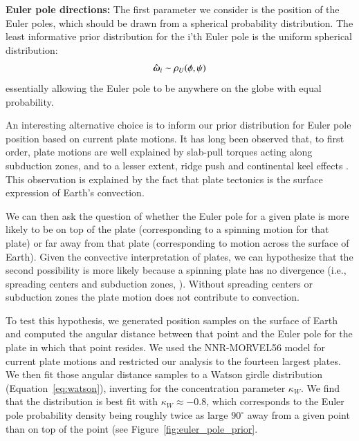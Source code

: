 \documentclass[preprint,12pt,authoryear]{elsarticle}
\newcommand{\mitbf}[1]{\hbox{\mathversion{bold}$#1$}}
\begin{document}
\textbf{Euler pole directions:} 
The first parameter we consider is the position of the Euler poles, which should be drawn
from a spherical probability distribution.
The least informative prior distribution for the i'th Euler pole is the uniform spherical distribution:
\begin{equation}
\hat{\mitbf{\omega}}_i \sim \rho_U(\phi, \psi)
\end{equation}
essentially allowing the Euler pole to be anywhere on the globe with equal probability.

An interesting alternative choice is to inform our prior distribution for Euler pole position based
on current plate motions. It has long been observed that, to first order, plate motions
are well explained by slab-pull torques acting along subduction zones, and to a lesser
extent, ridge push and continental keel effects \citep{forsyth1975relative, gordon1978absolute, richardson1992ridge}.
This observation is explained by the fact that plate tectonics is the 
surface expression of Earth's convection.

We can then ask the question of whether the Euler pole for a given plate is more likely
to be on top of the plate (corresponding to a spinning motion for that plate) or far away
from that plate (corresponding to motion across the surface of Earth).
Given the convective interpretation of plates, we can hypothesize that the second possibility
is more likely because a spinning plate has no divergence 
(i.e., spreading centers and subduction zones, \citep{forte1987plate, gable1991convection}). 
Without spreading centers or subduction zones the plate motion does not contribute to convection.

To test this hypothesis, we generated position samples on the surface of Earth and computed
the angular distance between that point and the Euler pole for the plate in which that point resides.
We used the NNR-MORVEL56 model for current plate motions \cite{argus2011geologically}
and restricted our analysis to the fourteen largest plates.
We then fit those angular distance samples to a Watson girdle distribution (Equation~\eqref{eq:watson}), 
inverting for the concentration parameter $\kappa_W$.
We find that the distribution is best fit with $\kappa_W \approx -0.8$, which corresponds
to the Euler pole probability density being roughly twice as large $90^\circ$
away from a given point than on top of the point (see Figure~\ref{fig:euler_pole_prior}.
\end{document}
